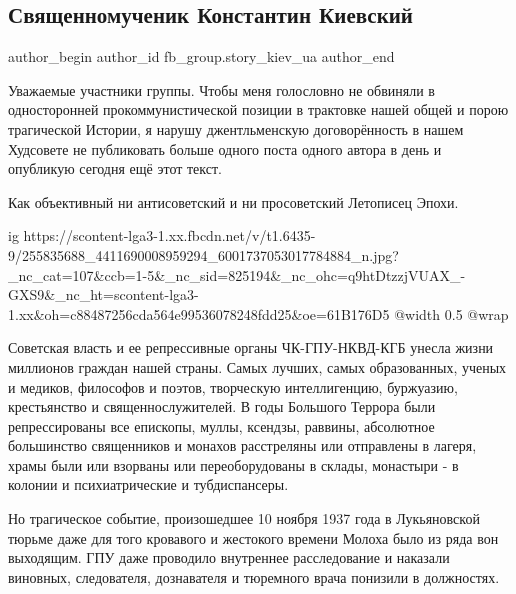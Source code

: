  
 
 
 
 
 
\subsection{Священномученик Константин Киевский}
\label{sec:10_11_2021.fb.fb_group.story_kiev_ua.2.konstantin_kievskij_muchenik}
 
\ifcmt
 author_begin
   author_id fb_group.story_kiev_ua
 author_end
\fi

Уважаемые участники группы. Чтобы меня голословно не обвиняли в односторонней
прокоммунистической позиции в трактовке нашей общей и порою трагической
Истории, я нарушу джентльменскую договорённость в нашем Худсовете  не
публиковать больше одного поста одного автора в день и опубликую сегодня ещё
этот текст. 

Как объективный ни антисоветский и ни просоветский Летописец Эпохи. 

\ifcmt
  ig https://scontent-lga3-1.xx.fbcdn.net/v/t1.6435-9/255835688_4411690008959294_6001737053017784884_n.jpg?_nc_cat=107&ccb=1-5&_nc_sid=825194&_nc_ohc=q9htDtzzjVUAX_-GXS9&_nc_ht=scontent-lga3-1.xx&oh=c88487256cda564e99536078248fdd25&oe=61B176D5
  @width 0.5
  @wrap 
\fi

Советская власть и ее репрессивные органы ЧК-ГПУ-НКВД-КГБ унесла жизни
миллионов граждан нашей страны. Самых лучших, самых образованных, ученых и
медиков, философов и поэтов, творческую интеллигенцию, буржуазию,
крестьянство и священнослужителей. В годы Большого Террора были
репрессированы все епископы, муллы, ксендзы, раввины, абсолютное
большинство священников и монахов расстреляны или отправлены в лагеря,
храмы были или взорваны или переоборудованы в склады, монастыри - в колонии
и психиатрические и тубдиспансеры. 

Но трагическое событие, произошедшее 10 ноября 1937 года в Лукьяновской
тюрьме даже для того кровавого и жестокого времени Молоха было из ряда вон
выходящим. ГПУ даже проводило внутреннее расследование и наказали виновных,
следователя, дознавателя и тюремного врача понизили в должностях. 

